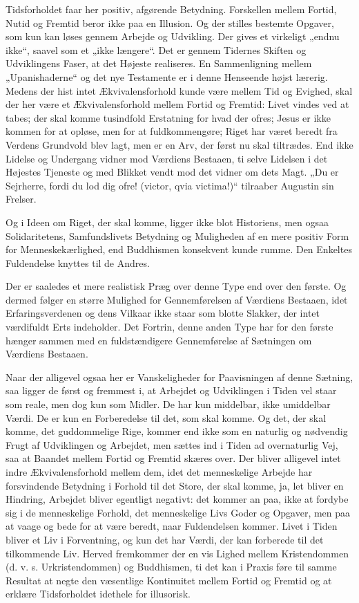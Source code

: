 \documentclass[12pt,a4paper,openany]{book}
\newcommand{\opage}[1]{\marginnote{\footnotesize\textit{[#1]}}}
\begin{document}
Tidsforholdet faar her positiv, afgørende Betydning. Forskellen mellem
Fortid, Nutid og Fremtid beror ikke paa en Illusion. Og der stilles
bestemte Opgaver, som kun kan løses gennem Arbejde og Udvikling. Der
gives et virkeligt „endnu ikke“, saavel som et „ikke længere“. Det er
gennem Tidernes Skiften og Udviklingens Faser, at det Højeste
realiseres. En Sammenligning mellem „Upanishaderne“ og det nye
Testamente er i denne Henseende højst lærerig. Medens der hist intet
Ækvivalensforhold kunde være mellem Tid og Evighed, skal der her være et
Ækvivalensforhold mellem Fortid og Fremtid: Livet vindes ved at tabes;
der skal komme tusindfold Erstatning for hvad der ofres; Jesus er ikke
kommen for at opløse, men for at fuldkommengøre; Riget har været beredt
fra Verdens Grundvold blev lagt, men er en Arv, der først nu skal
tiltrædes. End ikke Lidelse og Undergang vidner mod Værdiens Bestaaen,
ti selve Lidelsen i det Højestes Tjeneste og med Blikket vendt mod det
vidner om dets Magt. „Du er Sejrherre, fordi du lod dig ofre! (victor,
qvia victima!)“ tilraaber Augustin sin Frelser.

Og i Ideen om Riget, der skal komme, ligger ikke blot Historiens, men
ogsaa Solidaritetens, Samfundslivets Betydning og Muligheden af en mere
positiv Form for Menneskekærlighed, end Buddhismen konsekvent kunde
rumme. Den Enkeltes Fuldendelse knyttes til de Andres.

Der er saaledes et mere realistisk Præg over denne Type end over den
første. Og dermed følger en større Mulighed for Gennemførelsen af
Værdiens Bestaaen, idet Erfaringsverdenen og dens Vilkaar ikke staar som
blotte Slakker, der intet værdifuldt Erts indeholder. Det Fortrin, denne
anden Type har for den første hænger sammen med en fuldstændigere
Gennemførelse af Sætningen om Værdiens Bestaaen.

Naar der alligevel ogsaa her er Vanskeligheder for Paavisningen af denne
Sætning, saa ligger de først og fremmest i, at Arbejdet og Udviklingen i
Tiden vel staar som reale, men dog kun som Midler. De har kun middelbar,
ikke umiddelbar Værdi. De er kun en Forberedelse til det, som skal
komme. Og det, der
\opage{160}skal komme, det guddommelige Rige, kommer end ikke som en
naturlig og nødvendig Frugt af Udviklingen og Arbejdet, men sættes ind i
Tiden ad overnaturlig Vej, saa at Baandet mellem Fortid og Fremtid
skæres over. Der bliver alligevel intet indre Ækvivalensforhold mellem
dem, idet det menneskelige Arbejde har forsvindende Betydning i Forhold
til det Store, der skal komme, ja, let bliver en Hindring, Arbejdet
bliver egentligt negativt: det kommer an paa, ikke at fordybe sig i de
menneskelige Forhold, det menneskelige Livs Goder og Opgaver, men paa at
vaage og bede for at være beredt, naar Fuldendelsen kommer. Livet i
Tiden bliver et Liv i Forventning, og kun det har Værdi, der kan
forberede til det tilkommende Liv. Herved fremkommer der en vis Lighed
mellem Kristendommen (d. v. s. Urkristendommen) og Buddhismen, ti det
kan i Praxis føre til samme Resultat at negte den væsentlige Kontinuitet
mellem Fortid og Fremtid og at erklære Tidsforholdet idethele for
illusorisk.
\end{document}
